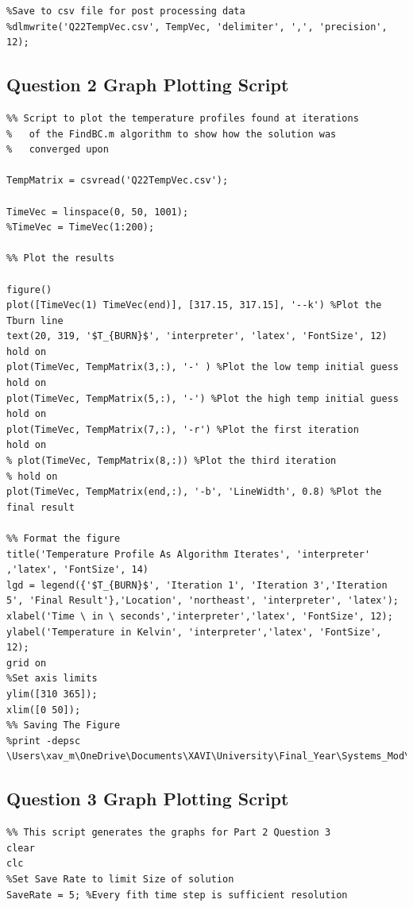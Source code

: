 \documentclass[11pt]{article}
\begin{document}
\begin{appendices}
\begin{lstlisting}
%Save to csv file for post processing data
%dlmwrite('Q22TempVec.csv', TempVec, 'delimiter', ',', 'precision', 12);

\end{lstlisting}
\clearpage
\subsection{Question 2 Graph Plotting Script}
\begin{lstlisting}
%% Script to plot the temperature profiles found at iterations
%   of the FindBC.m algorithm to show how the solution was 
%   converged upon

TempMatrix = csvread('Q22TempVec.csv');

TimeVec = linspace(0, 50, 1001);
%TimeVec = TimeVec(1:200);

%% Plot the results

figure()
plot([TimeVec(1) TimeVec(end)], [317.15, 317.15], '--k') %Plot the Tburn line
text(20, 319, '$T_{BURN}$', 'interpreter', 'latex', 'FontSize', 12)
hold on
plot(TimeVec, TempMatrix(3,:), '-' ) %Plot the low temp initial guess
hold on 
plot(TimeVec, TempMatrix(5,:), '-') %Plot the high temp initial guess
hold on
plot(TimeVec, TempMatrix(7,:), '-r') %Plot the first iteration
hold on
% plot(TimeVec, TempMatrix(8,:)) %Plot the third iteration
% hold on
plot(TimeVec, TempMatrix(end,:), '-b', 'LineWidth', 0.8) %Plot the final result

%% Format the figure
title('Temperature Profile As Algorithm Iterates', 'interpreter' ,'latex', 'FontSize', 14)
lgd = legend({'$T_{BURN}$', 'Iteration 1', 'Iteration 3','Iteration 5', 'Final Result'},'Location', 'northeast', 'interpreter', 'latex');
xlabel('Time \ in \ seconds','interpreter','latex', 'FontSize', 12);
ylabel('Temperature in Kelvin', 'interpreter','latex', 'FontSize', 12);
grid on
%Set axis limits
ylim([310 365]);
xlim([0 50]);
%% Saving The Figure
%print -depsc \Users\xav_m\OneDrive\Documents\XAVI\University\Final_Year\Systems_Mod\Modeling_CW2\Report\Figures\epsQ22BCTempProfs

\end{lstlisting}
\pagebreak


\subsection{Question 3 Graph Plotting Script}
\begin{lstlisting}
%% This script generates the graphs for Part 2 Question 3
clear
clc
%Set Save Rate to limit Size of solution
SaveRate = 5; %Every fith time step is sufficient resolution


\end{lstlisting}
\end{appendices}
\end{document}
